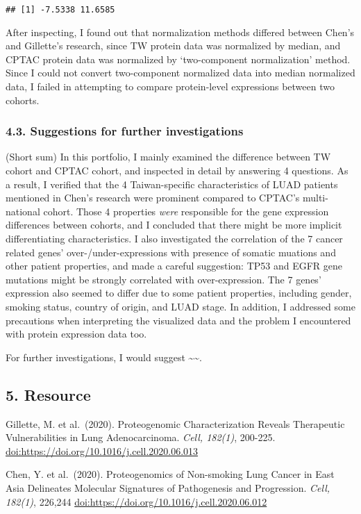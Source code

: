 \documentclass[
]{article}
\begin{document}
\begin{verbatim}
## [1] -7.5338 11.6585
\end{verbatim}

After inspecting, I found out that normalization methods differed
between Chen's and Gillette's research, since TW protein data was
normalized by median, and CPTAC protein data was normalized by
`two-component normalization' method. Since I could not convert
two-component normalized data into median normalized data, I failed in
attempting to compare protein-level expressions between two cohorts.

\hypertarget{suggestions-for-further-investigations}{%
\subsubsection{4.3. Suggestions for further
investigations}\label{suggestions-for-further-investigations}}

(Short sum) In this portfolio, I mainly examined the difference between
TW cohort and CPTAC cohort, and inspected in detail by answering 4
questions. As a result, I verified that the 4 Taiwan-specific
characteristics of LUAD patients mentioned in Chen's research were
prominent compared to CPTAC's multi-national cohort. Those 4 properties
\emph{were} responsible for the gene expression differences between
cohorts, and I concluded that there might be more implicit
differentiating characteristics. I also investigated the correlation of
the 7 cancer related genes' over-/under-expressions with presence of
somatic muations and other patient properties, and made a careful
suggestion: TP53 and EGFR gene mutations might be strongly correlated
with over-expression. The 7 genes' expression also seemed to differ due
to some patient properties, including gender, smoking status, country of
origin, and LUAD stage. In addition, I addressed some precautions when
interpreting the visualized data and the problem I encountered with
protein expression data too.

For further investigations, I would suggest
\textasciitilde\textasciitilde.

\hypertarget{resource}{%
\subsection{5. Resource}\label{resource}}

Gillette, M. et al.~(2020). Proteogenomic Characterization Reveals
Therapeutic Vulnerabilities in Lung Adenocarcinoma. \emph{Cell, 182(1)},
200-225. \url{doi:https://doi.org/10.1016/j.cell.2020.06.013}

Chen, Y. et al.~(2020). Proteogenomics of Non-smoking Lung Cancer in
East Asia Delineates Molecular Signatures of Pathogenesis and
Progression. \emph{Cell, 182(1)}, 226,244
\url{doi:https://doi.org/10.1016/j.cell.2020.06.012}
\end{document}
